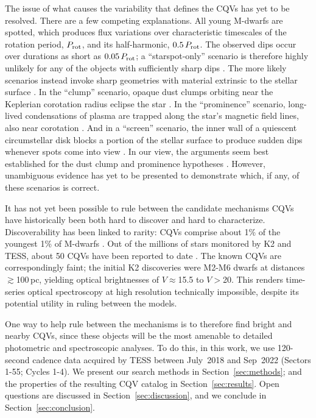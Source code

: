 \documentclass[11pt,twocolumn,tighten]{aastex63}
\begin{document}
The issue of what causes the variability that defines the CQVs has yet
to be resolved.  There are a few competing explanations.  All young
M-dwarfs are spotted, which produces flux variations over
characteristic timescales of the rotation period, $P_{\rm rot}$, and
its half-harmonic, $0.5\,P_{\rm rot}$.  The observed dips occur over
durations as short as $0.05\,P_{\rm rot}$; a ``starspot-only''
scenario is therefore highly unlikely for any of the objects with
sufficiently sharp dips
\citep{2017AJ....153..152S,2021MNRAS.500.1366K}.   The more likely
scenarios instead invoke sharp geometries with material extrinsic to
the stellar surface
\citep[e.g.][]{2017AJ....153..152S,2022AJ....163..144G}.  In the
``clump'' scenario, opaque dust clumps orbiting near the Keplerian
corotation radius eclipse the star
\citep{2017AJ....153..152S,2023MNRAS.518.4734S}.  In the
``prominence'' scenario, long-lived condensations of plasma are
trapped along the star’s magnetic field lines, also near corotation
\citep{2022MNRAS.514.5465W}.  And in a ``screen'' scenario, the inner
wall of a quiescent circumstellar disk blocks a portion of the stellar
surface to produce sudden dips whenever spots come into view
\citep{2019ApJ...876..127Z}.  In our view, the arguments seem best
established for the dust clump and prominence hypotheses
\citep{2023MNRAS.518.4734S,2022MNRAS.514.5465W}.  However, unambiguous
evidence has yet to be presented to demonstrate which, if any, of
these scenarios is correct.

It has not yet been possible to rule between the candidate mechanisms
CQVs have historically been both hard to discover and hard to
characterize.   Discoverability has been linked to rarity: CQVs
comprise about 1\% of the youngest 1\% of M-dwarfs
\citep{2018AJ....155..196R}.  Out of the millions of stars monitored
by K2 and TESS, about 50 CQVs have been reported to date
\citep{2016AJ....152..114R,2017AJ....153..152S,2018AJ....155...63S,2019ApJ...876..127Z,2020AJ....160...86B,2022AJ....163..144G,2023ApJ...945..114P}.
The known CQVs are correspondingly faint; the initial K2 discoveries
\citep{2016AJ....152..114R,2017AJ....153..152S} were M2-M6 dwarfs at
distances $\gtrsim$100\,pc, yielding optical brightnesses of
$V$$\approx$15.5 to $V$$>$20.  This renders time-series optical
spectroscopy at high resolution technically impossible, despite its
potential utility in ruling between the models.

One way to help rule between the mechanisms is to therefore find
bright and nearby CQVs, since these objects will be the most amenable
to detailed photometric and spectroscopic analyses.  To do this, in
this work, we use 120-second cadence data acquired by TESS between
July~2018 and Sep~2022 (Sectors 1-55; Cycles 1-4).  We present our
search methods in Section~\ref{sec:methods}; and the properties of the
resulting CQV catalog in Section~\ref{sec:results}.  Open questions
are discussed in Section~\ref{sec:discussion}, and we conclude in
Section~\ref{sec:conclusion}.
\end{document}
